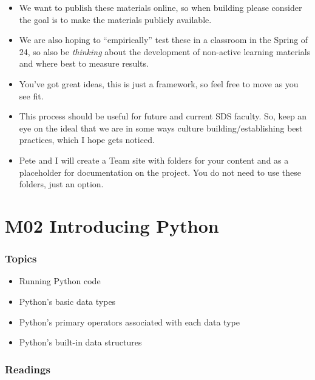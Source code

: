 \documentclass[
  letterpaper,
  DIV=11,
  numbers=noendperiod]{scrreprt}
\providecommand{\tightlist}{%
  \setlength{\itemsep}{0pt}\setlength{\parskip}{0pt}}\usepackage{longtable,booktabs,array}
\begin{document}
\begin{itemize}
\item
  We want to publish these materials online, so when building please
  consider the goal is to make the materials publicly available.
\item
  We are also hoping to ``empirically'' test these in a classroom in the
  Spring of 24, so also be \emph{thinking} about the development of
  non-active learning materials and where best to measure results.
\item
  You've got great ideas, this is just a framework, so feel free to move
  as you see fit.
\item
  This process should be useful for future and current SDS faculty. So,
  keep an eye on the ideal that we are in some ways culture
  building/establishing best practices, which I hope gets noticed.
\item
  Pete and I will create a Team site with folders for your content and
  as a placeholder for documentation on the project. You do not need to
  use these folders, just an option.
\end{itemize}

\part{M02 Introducing Python}

\hypertarget{topics}{%
\section*{Topics}\label{topics}}


\begin{itemize}
\tightlist
\item
  Running Python code
\item
  Python's basic data types
\item
  Python's primary operators associated with each data type
\item
  Python's built-in data structures
\end{itemize}

\hypertarget{readings}{%
\section*{Readings}\label{readings}}

\end{document}
